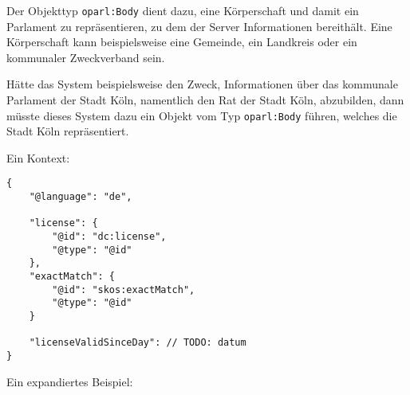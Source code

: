 \documentclass[,a4paper]{article}
\begin{document}
Der Objekttyp \texttt{oparl:Body} dient dazu, eine Körperschaft und
damit ein Parlament zu repräsentieren, zu dem der Server Informationen
bereithält. Eine Körperschaft kann beispielsweise eine Gemeinde, ein
Landkreis oder ein kommunaler Zweckverband sein.

Hätte das System beispielsweise den Zweck, Informationen über das
kommunale Parlament der Stadt Köln, namentlich den Rat der Stadt Köln,
abzubilden, dann müsste dieses System dazu ein Objekt vom Typ
\texttt{oparl:Body} führen, welches die Stadt Köln repräsentiert.

Ein Kontext:

\begin{verbatim}
{
    "@language": "de",
    
    "license": {
        "@id": "dc:license",
        "@type": "@id"
    },
    "exactMatch": {
        "@id": "skos:exactMatch",
        "@type": "@id"
    }
    
    "licenseValidSinceDay": // TODO: datum
}
\end{verbatim}

Ein expandiertes Beispiel:
\end{document}

